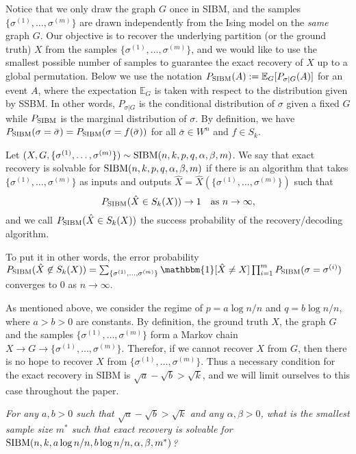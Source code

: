 \documentclass{article}
\begin{document}
Notice that we only draw the graph $G$ once in SIBM, and the samples $\{\sigma^{(1)},\dots,\sigma^{(m)}\}$ are drawn independently
from the Ising model on the {\em same} graph $G$.
Our objective is to recover the underlying partition (or the ground truth) $X$ from the samples $\{\sigma^{(1)},\dots,\sigma^{(m)}\}$, and we would like to use the smallest possible number of samples to guarantee the exact recovery of $X$ up to a global permutation.
Below we use the notation $P_{\operatorname{SIBM}}(A):=\mathbb{E}_G[P_{\sigma|G}(A)]$ for an event $A$, where the expectation $\mathbb{E}_G$ is taken with respect to the distribution given by SSBM. In other words, $P_{\sigma|G}$ is the conditional distribution of  $\sigma$ given a fixed $G$ while $P_{\operatorname{SIBM}}$ is the marginal distribution of $\sigma$.
By definition, we have $P_{\operatorname{SIBM}}(\sigma=\bar{\sigma})=P_{\operatorname{SIBM}}(\sigma=f(\bar{\sigma}))$ for all $\bar{\sigma}\in W^n$ and $f \in S_k$.

\begin{definition}
Let $(X,G,\{\sigma^{(1)},\dots,\sigma^{(m)}\}) \sim \operatorname{SIBM}(n,k, p,q,\alpha,\beta,m)$.
We say that exact recovery is solvable for $\operatorname{SIBM}(n,k,p,q,\alpha,\beta,m)$ if there is an algorithm that takes $\{\sigma^{(1)},\dots,\sigma^{(m)}\}$ as inputs and outputs $\hat{X}=\hat{X}(\{\sigma^{(1)},\dots,\sigma^{(m)}\})$ such that
$$
P_{\operatorname{SIBM}}(\hat{X} \in S_k(X)) \to 1
\text{~~~as~} n\to\infty ,
$$
and we call $P_{\operatorname{SIBM}}(\hat{X} \in S_k(X))$ the success probability of the recovery/decoding algorithm.
\end{definition}

To put it in other words, the error probability
$P_{\SIBM}(\hat{X} \not\in S_k(X)) =
\sum_{\{\sigma^{(1)},\dots,\sigma^{(m)}\}} \mathbbm{1}[\hat{X} \neq X]\prod_{i=1}^m P_{\SIBM}(\sigma = \sigma^{(i)}) 
$ converges to $0$ as $n\to \infty$.

As mentioned above, we consider the regime of $p=a\log n/n$ and $q=b\log n/n$, where $a>b> 0$ are constants. By definition, the ground truth $X$, the graph $G$ and the samples $\{\sigma^{(1)},\dots,\sigma^{(m)}\}$ form a Markov chain $X\to G\to \{\sigma^{(1)},\dots,\sigma^{(m)}\}$. Therefor, if we cannot recover $X$ from $G$, then there is no hope to recover $X$ from $\{\sigma^{(1)},\dots,\sigma^{(m)}\}$. Thus a necessary condition for the exact recovery in SIBM is $\sqrt{a}-\sqrt{b}> \sqrt{k}$, and we will limit ourselves to this case throughout the paper.

\vspace*{.1in}
 \emph{For any $a,b> 0$ such that $\sqrt{a}-\sqrt{b}> \sqrt{k}$ and any $\alpha,\beta>0$, what is the smallest sample size $m^\ast$ such that exact recovery is solvable for $\operatorname{SIBM}(n,k, a\log n/n, b\log n/n,\alpha,\beta,m^\ast)$?}
\end{document}
